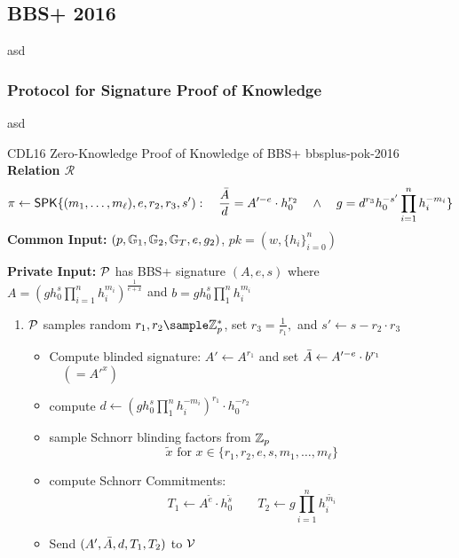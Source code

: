 % 
% 



\newpage
\subsection{BBS+ 2016 \cite{camenisch_anonymous_2016}}
asd
\subsubsection{Protocol for Signature Proof of Knowledge}
asd
\begin{protocol}{CDL16 Zero-Knowledge Proof of Knowledge of BBS+  \cite{camenisch_anonymous_2016}}{bbsplus-pok-2016}
    \textbf{Relation $\mathcal{R}$}
        \[
        \pi \gets \mathsf{SPK}\{(m_1,\ldots,m_{\ell}), e, r_2, r_3, s'): \quad \frac{\Bar{A}}{d} = A'^{-e} \cdot h_0^{r_2} \quad \wedge \quad g = d^{r_3}h_0^{-s'}\prod_{i=1}^n h_i^{-m_i}\}
        \]
    \textbf{Common Input:} $(p, \mathbb{G}_1, \mathbb{G}_2, \mathbb{G}_T, e, g_2)$, $pk = (\hat{w}, \{h_i\}_{i=0}^n)$

    \textbf{Private Input:} $\mathcal{P}$ has BBS+ signature $(A,e,s)$ where $A = (gh_0^s\prod_{i=1}^n h_i^{m_i})^{\frac{1}{e+x}}$ and $b = gh_0^s \prod_1^nh_i^{m_i}$

    \vspace{1em}
    \begin{enumerate}
        \item $\mathcal{P}$ samples random $r_1, r_2 \sample \Z_p^*$, set $r_3 = \frac{1}{r_1},$ and $s' \gets s - r_2 \cdot r_3$
         \begin{itemize}
        \item Compute blinded signature: $A' \gets A^{r_1}$ and set $\Bar{A} \gets A'^{-e} \cdot b^{r_1}$ $\quad (=A'^{x})$ 
        
        \item compute $d \gets (gh_0^s \prod_1^nh_i^{-m_i})^{r_1} \cdot h_0^{-r_2}$

        \item sample Schnorr blinding factors from $\mathbb{Z}_p$
         \[
         \tilde{x} \text{ for } x \in \{r_1, r_2, e, s, m_1, \ldots, m_{\ell}\}
         \]

        \item compute Schnorr Commitments:
        \[
        T_1 \gets A^{\tilde{e}} \cdot h_0^{\tilde{s}} \qquad T_2 \gets g\prod_{i=1}^n h_i^{\tilde{m_i}}
        \]
        
        \item  Send $(A', \Bar{A}, d, T_1, T_2)$ to $\mathcal{V}$
                

\end{itemize}
\end{enumerate}
\end{protocol}
